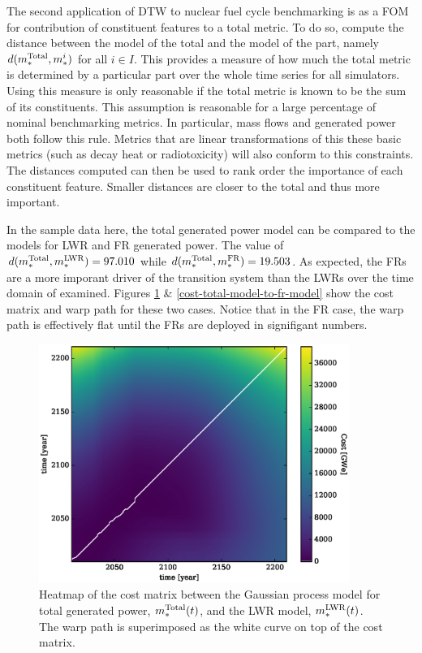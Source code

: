 The second application of DTW to nuclear fuel cycle benchmarking is as a
FOM for contribution of constituent features to a total metric. To do so, 
compute the distance between the model of the total and the model of the 
part, namely $d(m_*^{\mathrm{Total}}, m_*^i)$ for all $i \in I$. This provides a 
measure of how much the total metric is determined by a particular part
over the whole time series for all simulators.
Using this measure is only reasonable if the total metric is known 
to be the sum of its constituents.  This assumption is reasonable for 
a large percentage of nominal benchmarking metrics. In particular, 
mass flows and generated power both follow this rule. Metrics that are 
linear transformations of this these basic metrics (such as decay heat or 
radiotoxicity) will also conform to this constraints. The distances computed
can then be used to rank order the importance of each constituent feature. 
Smaller distances are closer to the total and thus more important.

In the sample data here, the total generated power model can be compared to 
the models for LWR and FR generated power. The value of 
$d(m_*^{\mathrm{Total}}, m_*^{\mathrm{LWR}}) = 97.010$ while $d(m_*^{\mathrm{Total}}, m_*^{\mathrm{FR}}) = 19.503$.
As expected, the FRs are a more imporant driver of the transition system 
than the LWRs over the time domain of examined. Figures 
\ref{cost-total-model-to-lwr-model} \& \ref{cost-total-model-to-fr-model}
show the cost matrix and warp path for these two cases.  Notice that in the
FR case, the warp path is effectively flat until the FRs are deployed in 
signifigant numbers. 
 
\begin{figure}[htb]
\centering
\includegraphics[width=0.9\textwidth]{cost-total-model-to-lwr-model.eps}
\caption{Heatmap of the cost matrix between the Gaussian process model 
for total generated power, $m_*^{\mathrm{Total}}(t)$, and the LWR model, 
$m_*^{\mathrm{LWR}}(t)$.
The warp path is superimposed as the white curve on top of the cost matrix.}
\label{cost-total-model-to-lwr-model}
\end{figure}

